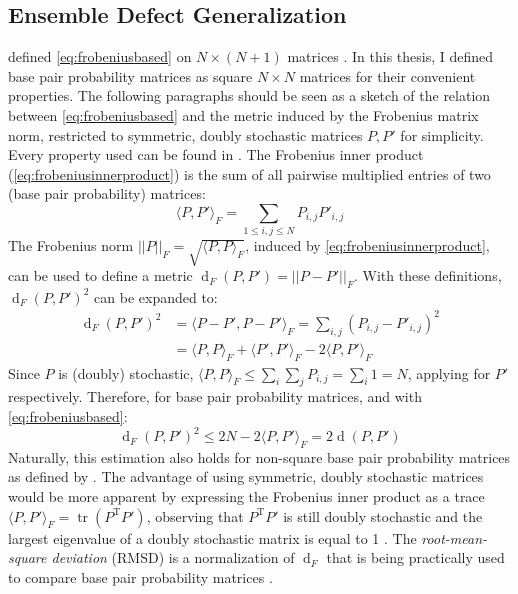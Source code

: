 \documentclass[../../master.tex]{subfiles}
\begin{document}
\subsection{Ensemble Defect Generalization}
\label{sub:appendix:frobenius}

\citeauthor{dirks_paradigms_2004} defined \autoref{eq:frobeniusbased} on $N \times (N+1)$ matrices \parencite{dirks_paradigms_2004}.
In this thesis, I defined base pair probability matrices as square $N \times N$ matrices for their convenient properties.
The following paragraphs should be seen as a sketch of the relation between \autoref{eq:frobeniusbased} and the metric induced by the Frobenius matrix norm, restricted to symmetric, doubly stochastic matrices $P, P'$ for simplicity.
Every property used can be found in \parencite{horn_matrix_2013}.
The Frobenius inner product (\autoref{eq:frobeniusinnerproduct}) is the sum of all pairwise multiplied entries of two (base pair probability) matrices:
\begin{equation}\label{eq:frobeniusinnerproduct}
	 \langle P, P' \rangle_F = \sum_{1\le i,j \le N} P_{i,j} P'_{i,j}
\end{equation}
The Frobenius norm $||P||_F = \sqrt{\langle P, P \rangle_F}$, induced by \autoref{eq:frobeniusinnerproduct}, can be used to define a metric $\operatorname{d}_F(P,P') = || P - P' ||_F$.
With these definitions, $\operatorname{d}_F(P,P')^2$ can be expanded to:
\begin{equation}\label{eq:frobeniusexpanded}
	\begin{aligned}
		\operatorname{d}_F(P,P')^2 &= \langle P-P', P-P' \rangle_F = \sum_{i,j} (P_{i,j} - P'_{i,j})^2 \\
		&= \langle P, P \rangle_F + \langle P', P' \rangle_F - 2 \langle P, P' \rangle_F
	\end{aligned}
\end{equation}
Since $P$ is (doubly) stochastic, $\langle P, P \rangle_F \le \sum_i \sum_j P_{i,j} = \sum_i 1 = N $, applying for $P'$ respectively.
Therefore, for base pair probability matrices, and with \autoref{eq:frobeniusbased}:
\begin{equation}\label{eq:frobeniusbpp}
		\operatorname{d}_F(P,P')^2 \le 2 N - 2 \langle P, P' \rangle_F = 2 \operatorname{d}(P,P')
\end{equation}
Naturally, this estimation also holds for non-square base pair probability matrices as defined by \citeauthor{dirks_paradigms_2004} \parencite{dirks_paradigms_2004}.
The advantage of using symmetric, doubly stochastic matrices would be more apparent by expressing the Frobenius inner product as a trace $ \langle P, P' \rangle_F = \operatorname{tr}(P^\mathrm{T}P') $, observing that $P^\mathrm{T}P'$ is still doubly stochastic and the largest eigenvalue of a doubly stochastic matrix is equal to 1 \parencite{horn_matrix_2013}.
The \emph{root-mean-square deviation} (RMSD)  is a normalization of $\operatorname{d}_F$ that is being practically used to compare base pair probability matrices \parencite{zhang_linearpartition_2020}.
\end{document}
